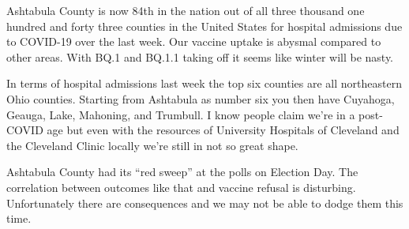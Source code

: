 Ashtabula County is now 84th in the nation out of all three thousand one
hundred and forty three counties in the United States for hospital
admissions due to COVID-19 over the last week. Our vaccine uptake is
abysmal compared to other areas. With BQ.1 and BQ.1.1 taking off it
seems like winter will be nasty.

In terms of hospital admissions last week the top six counties are all
northeastern Ohio counties. Starting from Ashtabula as number six you
then have Cuyahoga, Geauga, Lake, Mahoning, and Trumbull. I know people
claim we're in a post-COVID age but even with the resources of
University Hospitals of Cleveland and the Cleveland Clinic locally we're
still in not so great shape.

Ashtabula County had its ``red sweep'' at the polls on Election Day. The
correlation between outcomes like that and vaccine refusal is
disturbing. Unfortunately there are consequences and we may not be able
to dodge them this time.
